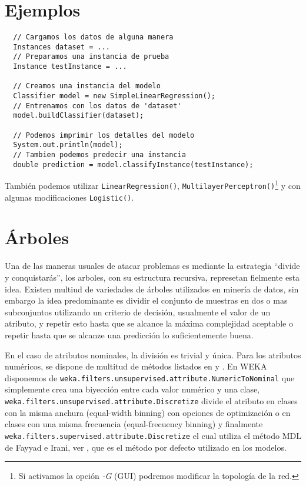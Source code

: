 \documentclass[10pt,a4paper]{article}
\begin{document}
\section{Ejemplos}

\begin{lstlisting}
  // Cargamos los datos de alguna manera
  Instances dataset = ...
  // Preparamos una instancia de prueba
  Instance testInstance = ...
  
  // Creamos una instancia del modelo
  Classifier model = new SimpleLinearRegression();
  // Entrenamos con los datos de 'dataset'
  model.buildClassifier(dataset);
  
  // Podemos imprimir los detalles del modelo
  System.out.println(model);
  // Tambien podemos predecir una instancia
  double prediction = model.classifyInstance(testInstance);
\end{lstlisting}

También podemos utilizar \lstinline{LinearRegression()}, \lstinline{MultilayerPerceptron()}\footnote{Si activamos la opción \textit{-G} (GUI) podremos modificar la topología de la red.} y con algunas modificaciones \lstinline{Logistic()}.


\section{Árboles}
Una de las maneras usuales de atacar problemas es mediante la estrategia ``divide y conquistarás'', los arboles, con su estructura recursiva, represetan fielmente esta idea. Existen multiud de variedades de árboles utilizados en minería de datos, sin embargo la idea predominante es dividir el conjunto de muestras en dos o mas subconjuntos utilizando un criterio de decisión, usualmente el valor de un atributo, y repetir esto hasta que se alcance la máxima complejidad aceptable o repetir hasta que se alcanze una predicción lo suficientemente buena.

En el caso de atributos nominales, la división es trivial y única. Para los atributos numéricos, se dispone de multitud de métodos listados en \cite{kotsiantis2006discretization} y \cite{dougherty1995supervised}. En WEKA disponemos de \lstinline{weka.filters.unsupervised.attribute.NumericToNominal} que simplemente crea una biyección entre cada valor numérico y una clase, \lstinline{weka.filters.unsupervised.attribute.Discretize} divide el atributo en clases con la misma anchura (equal-width binning) con opciones de optimización o en clases con una misma frecuencia (equal-frecuency binning) y finalmente \lstinline{weka.filters.supervised.attribute.Discretize} el cual utiliza el método MDL de Fayyad e Irani, ver \cite{irani1993multi}, que es el método por defecto utilizado en los modelos.
\end{document}
